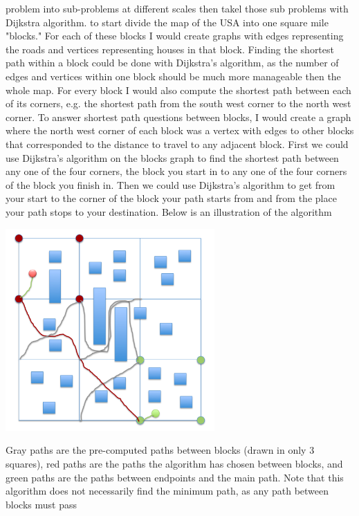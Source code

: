 \documentclass[11pt]{article}
\begin{document}
\begin{enumerate}
			problem into sub-problems at different scales then takel
			those sub problems with Dijkstra algorithm.
			to start divide the map of the USA into one square mile
			"blocks." For each of these blocks I would create graphs
			with edges representing the roads and vertices
			representing houses in that block. Finding the shortest
			path within a block could be done with Dijkstra's algorithm,
			as the number of edges and vertices within one block
			should be much more manageable then the whole map.
			For every block I would also compute the shortest path
			between each of its corners, e.g. the shortest path
			from the south west corner to the north west corner.
			To answer shortest path questions between blocks, I would
			create a graph where the north west corner of each block
			was a vertex with 
			edges to other blocks that corresponded to the distance
			to travel to any adjacent block.
			First we could use Dijkstra's algorithm on the blocks
			graph to find the shortest path between any one of the
			four corners, the block you start in to any one of the
			four corners of the block you finish in. Then we could
			use Dijkstra's algorithm to get  from your start
			to the corner of the block your path starts from and
			from the place your path stops to your destination.
			Below is an illustration of the algorithm 
			\begin{center}
				\includegraphics[width=0.6\textwidth]{images/fig2}
			\end{center}
			Gray paths are the pre-computed paths between blocks (drawn in
			only 3 squares), red paths are the paths the algorithm
			has chosen between blocks, and green paths are the paths
			between endpoints and the main path.
			Note that this algorithm does not necessarily find the
			minimum path, as any path between blocks must pass

\end{enumerate}
\end{document}
